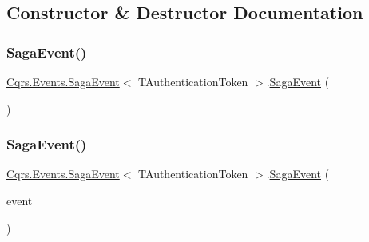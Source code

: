 \subsection{Constructor \& Destructor Documentation}
\mbox{\label{classCqrs_1_1Events_1_1SagaEvent_a658ce04baccb816bf132702cccaa6a90_a658ce04baccb816bf132702cccaa6a90}} 
\subsubsection{\texorpdfstring{Saga\+Event()}{SagaEvent()}\hspace{0.1cm}{\footnotesize\ttfamily [1/2]}}
{\footnotesize\ttfamily \hyperlink{classCqrs_1_1Events_1_1SagaEvent}{Cqrs.\+Events.\+Saga\+Event}$<$ T\+Authentication\+Token $>$.\hyperlink{classCqrs_1_1Events_1_1SagaEvent}{Saga\+Event} (\begin{DoxyParamCaption}{ }\end{DoxyParamCaption})}

\mbox{\label{classCqrs_1_1Events_1_1SagaEvent_aeb42f8e8f8e18bffe0dbe55b3da3c476_aeb42f8e8f8e18bffe0dbe55b3da3c476}} 
\subsubsection{\texorpdfstring{Saga\+Event()}{SagaEvent()}\hspace{0.1cm}{\footnotesize\ttfamily [2/2]}}
{\footnotesize\ttfamily \hyperlink{classCqrs_1_1Events_1_1SagaEvent}{Cqrs.\+Events.\+Saga\+Event}$<$ T\+Authentication\+Token $>$.\hyperlink{classCqrs_1_1Events_1_1SagaEvent}{Saga\+Event} (\begin{DoxyParamCaption}\item[{\hyperlink{interfaceCqrs_1_1Events_1_1IEvent}{I\+Event}$<$ T\+Authentication\+Token $>$ @}]{event }\end{DoxyParamCaption})}



